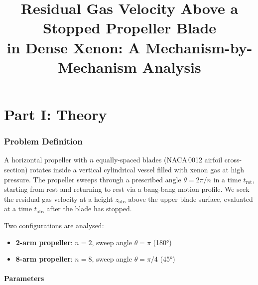 \documentclass[11pt,a4paper]{article}
\title{Residual Gas Velocity Above a Stopped Propeller Blade\\
       in Dense Xenon: A Mechanism-by-Mechanism Analysis}
\author{}
\date{}
\begin{document}
\maketitle


\part*{Part I: Theory}

\section{Problem Definition}
\label{sec:problem}

A horizontal propeller with $n$ equally-spaced blades (NACA\,0012 airfoil
cross-section) rotates inside a vertical cylindrical vessel filled with xenon
gas at high pressure. The propeller sweeps through a prescribed angle
$\theta = 2\pi/n$ in a time $t_\mathrm{rot}$, starting from rest and returning
to rest via a bang-bang motion profile. We seek the residual gas velocity at a
height $z_\mathrm{obs}$ above the upper blade surface, evaluated at a time
$t_\mathrm{obs}$ after the blade has stopped.

Two configurations are analysed:
\begin{itemize}[nosep]
  \item \textbf{2-arm propeller}: $n = 2$, sweep angle $\theta = \pi$ (180°)
  \item \textbf{8-arm propeller}: $n = 8$, sweep angle $\theta = \pi/4$ (45°)
\end{itemize}

\subsection{Parameters}
\end{document}
